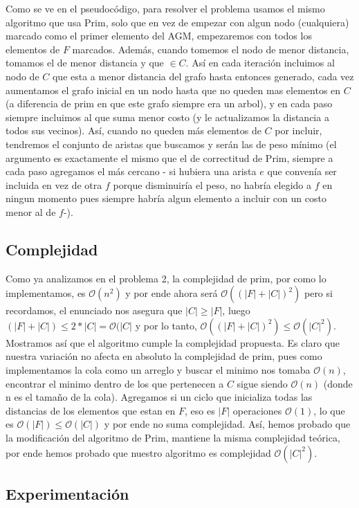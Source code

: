 \documentclass[A4paper,oneside,fleqn,11pt]{article}
\theoremstyle{definition}
\begin{document}
Como se ve en el pseudocódigo, para resolver el problema usamos el mismo algoritmo que usa Prim, solo que en vez de empezar con algun nodo (cualquiera) marcado como el primer elemento del AGM, empezaremos con todos los elementos de $F$ marcados. Además, cuando tomemos el nodo de menor distancia, tomamos el de menor distancia y que $\in C$. Así en cada iteración incluimos al nodo de $C$ que esta a menor distancia del grafo hasta entonces generado, cada vez aumentamos el grafo inicial en un nodo hasta que no queden mas elementos en $C$ (a diferencia de prim en que este grafo siempre era un arbol), y en cada paso siempre incluimos al que suma menor costo (y le actualizamos la distancia a todos sus vecinos). Así, cuando no queden más elementos de $C$ por incluir, tendremos el conjunto de aristas que buscamos y serán las de peso mínimo (el argumento es exactamente el mismo que el de correctitud de Prim, siempre a cada paso agregamos el más cercano - si hubiera una arista $e$ que convenía ser incluida en vez de otra $f$ porque disminuiría el peso, no habría elegido a $f$ en ningun momento pues siempre habría algun elemento a incluir con un costo menor al de $f$-). 

\subsection{Complejidad}

Como ya analizamos en el problema 2, la complejidad de prim, por como lo implementamos, es $\mathcal{O} (n^2)$ y por ende ahora será $\mathcal{O} ((|F|+|C|)^2)$ pero si recordamos, el enunciado nos asegura que $|C| \geq |F|$, luego $(|F|+|C|) \leq 2 *|C| = \mathcal{O} (|C|$ y por lo tanto, $\mathcal{O} ((|F|+|C|)^2) \leq \mathcal{O} (|C|^2)$. Mostramos así que el algoritmo cumple la complejidad propuesta. Es claro que nuestra variación no afecta en absoluto la complejidad de prim, pues como implementamos la cola como un arreglo y buscar el minimo nos tomaba $\mathcal{O} (n)$, encontrar el minimo dentro de los que pertenecen a $C$ sigue siendo $\mathcal{O} (n)$ (donde n es el tamaño de la cola). Agregamos si un ciclo que inicializa todas las distancias de los elementos que estan en $F$, eso es $|F|$ operaciones $\mathcal{O} (1)$, lo que es $\mathcal{O} (|F|) \leq \mathcal{O} (|C|)$ y por ende no suma complejidad. Así, hemos probado que la modificación del algoritmo de Prim, mantiene la misma complejidad teórica, por ende hemos probado que nuestro algoritmo es complejidad $\mathcal{O} (|C|^2)$.

\subsection{Experimentación}
\end{document}
